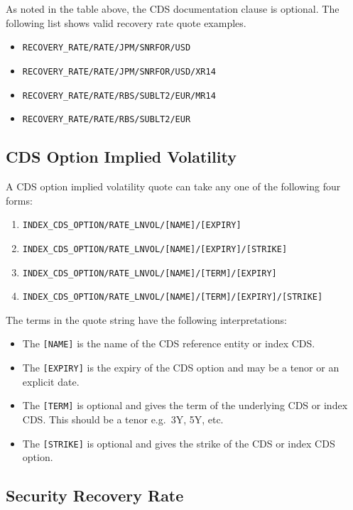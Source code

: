 As noted in the table above, the CDS documentation clause is optional. The following list shows valid recovery rate quote examples.
\begin{itemize}
\item \lstinline!RECOVERY_RATE/RATE/JPM/SNRFOR/USD!
\item \lstinline!RECOVERY_RATE/RATE/JPM/SNRFOR/USD/XR14!
\item \lstinline!RECOVERY_RATE/RATE/RBS/SUBLT2/EUR/MR14!
\item \lstinline!RECOVERY_RATE/RATE/RBS/SUBLT2/EUR!
\end{itemize}

\subsection{CDS Option Implied Volatility}
\label{md:cds_option_iv}

A CDS option implied volatility quote can take any one of the following four forms:

\begin{enumerate}
\item \lstinline!INDEX_CDS_OPTION/RATE_LNVOL/[NAME]/[EXPIRY]!
\item \lstinline!INDEX_CDS_OPTION/RATE_LNVOL/[NAME]/[EXPIRY]/[STRIKE]!
\item \lstinline!INDEX_CDS_OPTION/RATE_LNVOL/[NAME]/[TERM]/[EXPIRY]!
\item \lstinline!INDEX_CDS_OPTION/RATE_LNVOL/[NAME]/[TERM]/[EXPIRY]/[STRIKE]!
\end{enumerate}

The terms in the quote string have the following interpretations:
\begin{itemize}
\item The \lstinline![NAME]! is the name of the CDS reference entity or index CDS.
\item The \lstinline![EXPIRY]! is the expiry of the CDS option and may be a tenor or an explicit date.
\item The \lstinline![TERM]! is optional and gives the term of the underlying CDS or index CDS. This should be a tenor e.g.\ 3Y, 5Y, etc.
\item The \lstinline![STRIKE]! is optional and gives the strike of the CDS or index CDS option.
\end{itemize}


\subsection{Security Recovery Rate}\label{md:sec_rec_rates}

